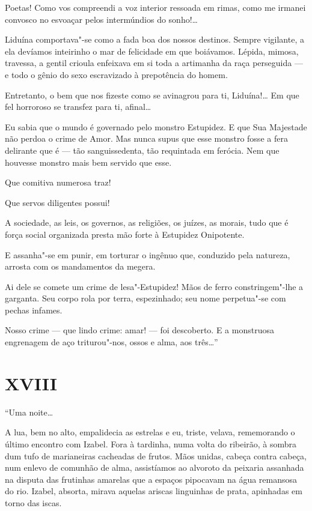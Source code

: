 Poetas! Como vos compreendi a voz interior ressoada em rimas, como me
irmanei convosco no esvoaçar pelos intermúndios do sonho!\ldots{}

Liduína comportava"-se como a fada boa dos nossos destinos. Sempre
vigilante, a ela devíamos inteirinho o mar de felicidade em que
boiávamos. Lépida, mimosa, travessa, a gentil crioula enfeixava em si
toda a artimanha da raça perseguida --- e todo o gênio do sexo
escravizado à prepotência do homem.

Entretanto, o bem que nos fizeste como se avinagrou para ti, Liduína!\ldots{}
Em que fel horroroso se transfez para ti, afinal\ldots{}

Eu sabia que o mundo é governado pelo monstro Estupidez. E que Sua
Majestade não perdoa o crime de Amor. Mas nunca supus que esse monstro
fosse a fera delirante que é --- tão sanguissedenta, tão requintada em
ferócia. Nem que houvesse monstro mais bem servido que esse.

Que comitiva numerosa traz!

Que servos diligentes possui!

A sociedade, as leis, os governos, as religiões, os juízes, as morais,
tudo que é força social organizada presta mão forte à Estupidez
Onipotente.

E assanha"-se em punir, em torturar o ingênuo que, conduzido pela
natureza, arrosta com os mandamentos da megera.

Ai dele se comete um crime de lesa"-Estupidez! Mãos de ferro
constringem"-lhe a garganta. Seu corpo rola por terra, espezinhado; seu
nome perpetua"-se com pechas infames.

Nosso crime --- que lindo crime: amar! --- foi descoberto. E a
monstruosa engrenagem de aço triturou"-nos, ossos e alma, aos três\ldots{}''

\section*{XVIII}

``Uma noite\ldots{}

A lua, bem no alto, empalidecia as estrelas e eu, triste, velava,
rememorando o último encontro com Izabel. Fora à tardinha, numa volta do
ribeirão, à sombra dum tufo de marianeiras cacheadas de frutos. Mãos
unidas, cabeça contra cabeça, num enlevo de comunhão de alma,
assistíamos ao alvoroto da peixaria assanhada na disputa das frutinhas
amarelas que a espaços pipocavam na água remansosa do rio. Izabel,
absorta, mirava aquelas ariscas linguinhas de prata, apinhadas em torno
das iscas.

